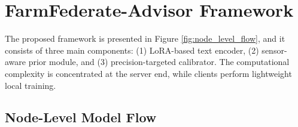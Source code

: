 \documentclass[10pt,journal,compsoc]{IEEEtran}
\begin{document}
\section{FarmFederate-Advisor Framework}
\label{sec:method}

The proposed framework is presented in Figure \ref{fig:node_level_flow}, and it consists of three main components: (1) LoRA-based text encoder, (2) sensor-aware prior module, and (3) precision-targeted calibrator. The computational complexity is concentrated at the server end, while clients perform lightweight local training.

\subsection{Node-Level Model Flow}
\end{document}
